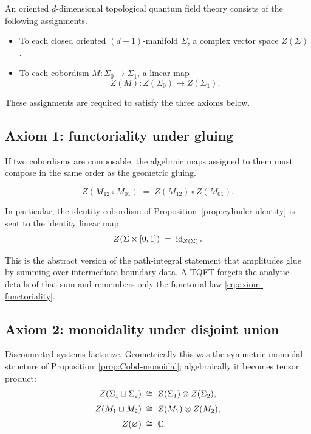 \begin{definition}\label{def:Atiyah-Segal}
An oriented $d$-dimensional topological quantum field theory consists of the following assignments.
\begin{itemize}
\item To each closed oriented $(d-1)$-manifold $\Sigma$, a complex vector space $Z(\Sigma)$.
\item To each cobordism $M : \Sigma_0 \to \Sigma_1$, a linear map
\begin{equation}\label{eq:Z-of-cobordism}
Z(M) : Z(\Sigma_0) \longrightarrow Z(\Sigma_1).
\end{equation}
\end{itemize}
These assignments are required to satisfy the three axioms below.
\end{definition}

\subsection{Axiom 1: functoriality under gluing}

If two cobordisms are composable, the algebraic maps assigned to them must compose in the same order as the geometric gluing.

\begin{equation}\label{eq:axiom-functoriality}
Z(M_{12} \circ M_{01}) \;=\; Z(M_{12}) \circ Z(M_{01}).
\end{equation}

\noindent In particular, the identity cobordism of Proposition~\ref{prop:cylinder-identity} is sent to the identity linear map:
\begin{equation}\label{eq:axiom-identity}
Z(\Sigma \times [0,1]) \;=\; \operatorname{id}_{Z(\Sigma)}.
\end{equation}

\noindent This is the abstract version of the path-integral statement that amplitudes glue by summing over intermediate boundary data. A TQFT forgets the analytic details of that sum and remembers only the functorial law \eqref{eq:axiom-functoriality}.

\subsection{Axiom 2: monoidality under disjoint union}

Disconnected systems factorize. Geometrically this was the symmetric monoidal structure of Proposition~\ref{prop:Cobd-monoidal}; algebraically it becomes tensor product:
\begin{align}
Z(\Sigma_1 \sqcup \Sigma_2) &\;\cong\; Z(\Sigma_1)\otimes Z(\Sigma_2), \label{eq:axiom-monoidal-objects} \\[1mm]
Z(M_1 \sqcup M_2) &\;\cong\; Z(M_1)\otimes Z(M_2), \label{eq:axiom-monoidal-morphisms} \\[1mm]
Z(\varnothing) &\;\cong\; \mathbb{C}. \label{eq:axiom-empty}
\end{align}

